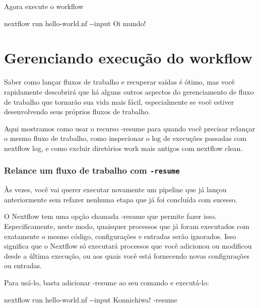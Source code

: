 \documentclass[
  brazilian,
  letterpaper,
  DIV=11,
  numbers=noendperiod]{scrreprt}
\newenvironment{Shaded}{\begin{snugshade}}{\end{snugshade}}
\newcommand{\AttributeTok}[1]{\textcolor[rgb]{0.40,0.45,0.13}{#1}}
\newcommand{\ExtensionTok}[1]{\textcolor[rgb]{0.00,0.23,0.31}{#1}}
\newcommand{\NormalTok}[1]{\textcolor[rgb]{0.00,0.23,0.31}{#1}}
\newcommand{\StringTok}[1]{\textcolor[rgb]{0.13,0.47,0.30}{#1}}
\begin{document}
Agora execute o workflow

\begin{Shaded}
\begin{Highlighting}[]
\ExtensionTok{nextflow}\NormalTok{ run hello{-}world.nf }\AttributeTok{{-}{-}input} \StringTok{\textquotesingle{}Oi mundo!\textquotesingle{}}
\end{Highlighting}
\end{Shaded}

\chapter{Gerenciando execução do
workflow}\label{gerenciando-execuuxe7uxe3o-do-workflow}

Saber como lançar fluxos de trabalho e recuperar saídas é ótimo, mas
você rapidamente descobrirá que há alguns outros aspectos do
gerenciamento de fluxo de trabalho que tornarão sua vida mais fácil,
especialmente se você estiver desenvolvendo seus próprios fluxos de
trabalho.

Aqui mostramos como usar o recurso -resume para quando você precisar
relançar o mesmo fluxo de trabalho, como inspecionar o log de execuções
passadas com nextflow log, e como excluir diretórios work mais antigos
com nextflow clean.

\subsection{\texorpdfstring{Relance um fluxo de trabalho com
\texttt{-resume}}{Relance um fluxo de trabalho com -resume}}\label{relance-um-fluxo-de-trabalho-com--resume}

Às vezes, você vai querer executar novamente um pipeline que já lançou
anteriormente sem refazer nenhuma etapa que já foi concluída com
sucesso.

O Nextflow tem uma opção chamada -resume que permite fazer isso.
Especificamente, neste modo, quaisquer processos que já foram executados
com exatamente o mesmo código, configurações e entradas serão ignorados.
Isso significa que o Nextflow só executará processos que você adicionou
ou modificou desde a última execução, ou aos quais você está fornecendo
novas configurações ou entradas.

Para usá-lo, basta adicionar -resume ao seu comando e executá-lo:

\begin{Shaded}
\begin{Highlighting}[]
\ExtensionTok{nextflow}\NormalTok{ run hello{-}world.nf }\AttributeTok{{-}{-}input} \StringTok{\textquotesingle{}Konnichiwa!\textquotesingle{}} \AttributeTok{{-}resume}
\end{Highlighting}
\end{Shaded}
\end{document}
